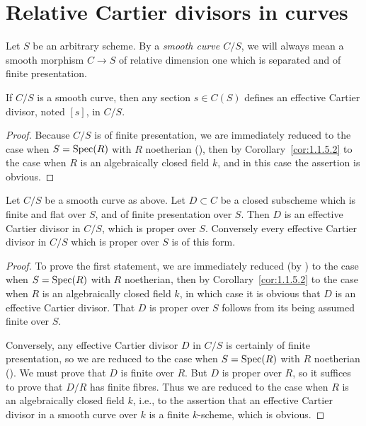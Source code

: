 \section{Relative Cartier divisors in curves}
\label{sec:1.2}

\kmitem\label{item:1.2.1}
Let $S$ be an arbitrary scheme. By a \emph{smooth curve $C/S$}, we will always mean a smooth morphism $C \to S$ of relative dimension one which is separated and of finite presentation.

\begin{lemma}\label{lem:1.2.2}
If $C/S$ is a smooth curve, then any section $s \in C(S)$ defines an effective Cartier divisor, noted $[s]$, in $C/S$.
\end{lemma}

\begin{proof}
Because $C/S$ is of finite presentation, we are immediately reduced to the case when $S = \operatorname{Spec}(R)$ with $R$ noetherian (\cite[IV, 8.9.1]{EGA}), then by Corollary~\ref{cor:1.1.5.2} to the case when $R$ is an algebraically closed field $k$, and in this case the assertion is obvious.
\end{proof}

\begin{lemma}\label{lem:1.2.3}
Let $C/S$ be a smooth curve as above. Let $D \subset C$ be a closed subscheme which is finite and flat over $S$, and of finite presentation over $S$. Then $D$ is an effective Cartier divisor in $C/S$, which is proper over $S$. Conversely every effective Cartier divisor in $C/S$ which is proper over $S$ is of this form.
\end{lemma}

\begin{proof}
To prove the first statement, we are immediately reduced (by \cite[IV, 8.9.1 and 11.2.6.1]{EGA}) to the case when $S = \operatorname{Spec}(R)$ with $R$ noetherian, then by Corollary~\ref{cor:1.1.5.2} to the case when $R$ is an algebraically closed field $k$, in which case it is obvious that $D$ is an effective Cartier divisor. That $D$ is proper over $S$ follows from its being assumed finite over $S$.

Conversely, any effective Cartier divisor $D$ in $C/S$ is certainly of finite presentation, so we are reduced to the case when $S = \operatorname{Spec}(R)$ with $R$ noetherian (\cite[IV, 8.9.1 and 11.2.6.1]{EGA}). We must prove that $D$ is finite over $R$. But $D$ is proper over $R$, so it suffices to prove that $D/R$ has finite fibres. Thus we are reduced to the case when $R$ is an algebraically closed field $k$, i.e., to the assertion that an effective Cartier divisor in a smooth curve over $k$ is a finite $k$-scheme, which is obvious.
\end{proof}

